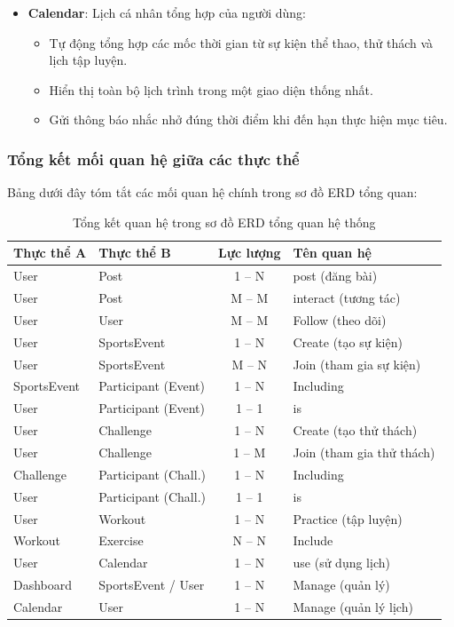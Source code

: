 \begin{itemize}
    \item \textbf{Calendar}: Lịch cá nhân tổng hợp của người dùng:
    \begin{itemize}
        \item Tự động tổng hợp các mốc thời gian từ sự kiện thể thao, thử thách và lịch tập luyện.
        \item Hiển thị toàn bộ lịch trình trong một giao diện thống nhất.
        \item Gửi thông báo nhắc nhở đúng thời điểm khi đến hạn thực hiện mục tiêu.
    \end{itemize}
\end{itemize}


\subsubsection{Tổng kết mối quan hệ giữa các thực thể}
\label{subsubsec:erd_relationships_summary}
Bảng dưới đây tóm tắt các mối quan hệ chính trong sơ đồ ERD tổng quan:

\begin{table}[H]
\centering
\caption{Tổng kết quan hệ trong sơ đồ ERD tổng quan hệ thống}
\label{tab:erd_relationships}
\begin{tabular}{|l|l|c|l|}
\hline
\textbf{Thực thể A} & \textbf{Thực thể B} & \textbf{Lực lượng} & \textbf{Tên quan hệ} \\
\hline
User & Post & 1 -- N & post (đăng bài) \\
User & Post & M -- M & interact (tương tác) \\
User & User & M -- M & Follow (theo dõi) \\
User & SportsEvent & 1 -- N & Create (tạo sự kiện) \\
User & SportsEvent & M -- N & Join (tham gia sự kiện) \\
SportsEvent & Participant (Event) & 1 -- N & Including \\
User & Participant (Event) & 1 -- 1 & is \\
User & Challenge & 1 -- N & Create (tạo thử thách) \\
User & Challenge & 1 -- M & Join (tham gia thử thách) \\
Challenge & Participant (Chall.) & 1 -- N & Including \\
User & Participant (Chall.) & 1 -- 1 & is \\
User & Workout & 1 -- N & Practice (tập luyện) \\
Workout & Exercise & N -- N & Include \\
User & Calendar & 1 -- N & use (sử dụng lịch) \\
Dashboard & SportsEvent / User & 1 -- N & Manage (quản lý) \\
Calendar & User & 1 -- N & Manage (quản lý lịch) \\
\hline
\end{tabular}
\end{table}


